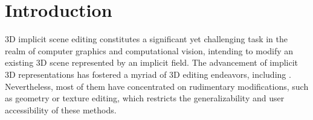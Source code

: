 \section{Introduction}
\label{sec:intro}




3D implicit scene editing constitutes a significant yet challenging task in the realm of computer graphics and computational vision, intending to modify an existing 3D scene represented by an implicit field. The advancement of implicit 3D representations has fostered a myriad of 3D editing endeavors, including \cite{yuan2022nerf, garbin2022voltemorph, xu2022deforming, tertikas2023partnerf, peng2022cagenerf, jambon2023nerfshop, liu2021editing, xiang2021neutex, gong2023recolornerf, kuang2023palettenerf, lee2023ice, niemeyer2021giraffe, xu2023discoscene, li2022climatenerf, zhang2021nerfactor, boss2021neural, srinivasan2021nerv, zhang2022arf, wang2023nerf}. Nevertheless, most of them have concentrated on rudimentary modifications, such as geometry or texture editing, which restricts the generalizability and user accessibility of these methods.

